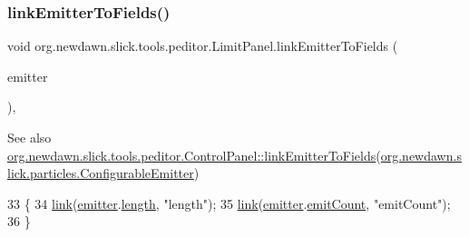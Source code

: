 \subsubsection{\texorpdfstring{link\+Emitter\+To\+Fields()}{linkEmitterToFields()}}
{\footnotesize\ttfamily void org.\+newdawn.\+slick.\+tools.\+peditor.\+Limit\+Panel.\+link\+Emitter\+To\+Fields (\begin{DoxyParamCaption}\item[{\mbox{\hyperlink{classorg_1_1newdawn_1_1slick_1_1particles_1_1_configurable_emitter}{Configurable\+Emitter}}}]{emitter }\end{DoxyParamCaption})\hspace{0.3cm}{\ttfamily [inline]}, {\ttfamily [protected]}}

\begin{DoxySeeAlso}{See also}
\mbox{\hyperlink{classorg_1_1newdawn_1_1slick_1_1tools_1_1peditor_1_1_control_panel_a55fa468548caadc265ea28c5f3214a20}{org.\+newdawn.\+slick.\+tools.\+peditor.\+Control\+Panel\+::link\+Emitter\+To\+Fields}}(\mbox{\hyperlink{classorg_1_1newdawn_1_1slick_1_1particles_1_1_configurable_emitter}{org.\+newdawn.\+slick.\+particles.\+Configurable\+Emitter}}) 
\end{DoxySeeAlso}

\begin{DoxyCode}
33                                                                     \{
34         \mbox{\hyperlink{classorg_1_1newdawn_1_1slick_1_1tools_1_1peditor_1_1_control_panel_a0cd8f0c59ddca29c48029fcc41c0bbde}{link}}(\mbox{\hyperlink{classorg_1_1newdawn_1_1slick_1_1tools_1_1peditor_1_1_control_panel_aaa170169fa574cb6b271f782afcd2517}{emitter}}.\mbox{\hyperlink{classorg_1_1newdawn_1_1slick_1_1particles_1_1_configurable_emitter_afe1766fe8f366d2eb6d051877a9920e9}{length}}, \textcolor{stringliteral}{"length"});
35         \mbox{\hyperlink{classorg_1_1newdawn_1_1slick_1_1tools_1_1peditor_1_1_control_panel_a0cd8f0c59ddca29c48029fcc41c0bbde}{link}}(\mbox{\hyperlink{classorg_1_1newdawn_1_1slick_1_1tools_1_1peditor_1_1_control_panel_aaa170169fa574cb6b271f782afcd2517}{emitter}}.\mbox{\hyperlink{classorg_1_1newdawn_1_1slick_1_1particles_1_1_configurable_emitter_ada09b861f9d81935e3fb2729e2660871}{emitCount}}, \textcolor{stringliteral}{"emitCount"});
36     \}
\end{DoxyCode}
\mbox{\label{classorg_1_1newdawn_1_1slick_1_1tools_1_1peditor_1_1_limit_panel_a2e80ba4676be1b1e01aaec91f0e190b2}} 
